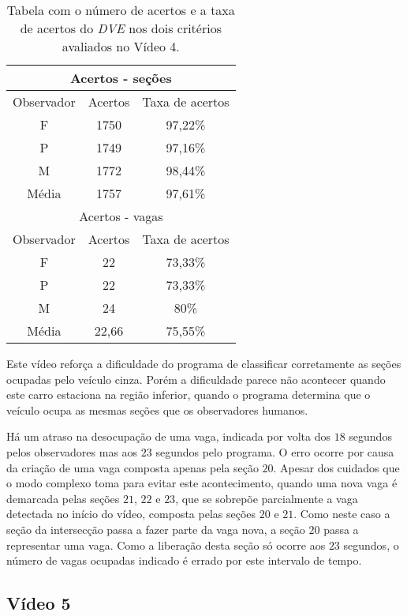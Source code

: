 \begin{table}[H]
\begin{center}
\begin{tabular}{|c||c||c|}
\hline
\multicolumn{3}{|c|}{Acertos - seções}  \\ \hline \hline
Observador & Acertos & Taxa de acertos \\ \hline
F & 1750 & 97,22\% \\  \hline
P & 1749 & 97,16\% \\ \hline
M & 1772 & 98,44\% \\ \hline
Média & 1757 & 97,61\% \\
\hline
\hline
\multicolumn{3}{|c|}{Acertos - vagas}  \\ \hline \hline
Observador & Acertos & Taxa de acertos \\ \hline
F & 22 & 73,33\% \\  \hline
P & 22 & 73,33\% \\ \hline
M & 24 & 80\% \\ \hline
Média & 22,66 & 75,55\% \\
\hline
\end{tabular}
\end{center}
\caption{Tabela com o número de acertos e a taxa de acertos do \textit{DVE} nos dois critérios avaliados no Vídeo 4.}
\label{tab:rvideo4}
\end{table}

Este vídeo reforça a dificuldade do programa de classificar corretamente as seções ocupadas pelo veículo cinza. Porém a dificuldade parece não acontecer quando este carro estaciona na região inferior, quando o programa determina que o veículo ocupa as mesmas seções que os observadores humanos.

Há um atraso na desocupação de uma vaga, indicada por volta dos $18$ segundos pelos observadores mas aos $23$ segundos pelo programa. O erro ocorre por causa da criação de uma vaga composta apenas pela seção $20$. Apesar dos cuidados que o modo complexo toma para evitar este acontecimento, quando uma nova vaga é demarcada pelas seções $21$, $22$ e $23$, que se sobrepõe parcialmente a vaga detectada no início do vídeo, composta pelas seções $20$ e $21$. Como neste caso a seção da intersecção passa a fazer parte da vaga nova, a seção $20$ passa a representar uma vaga. Como a liberação desta seção só ocorre aos $23$ segundos, o número de vagas ocupadas indicado é errado por este intervalo de tempo.


\subsection{Vídeo 5}

